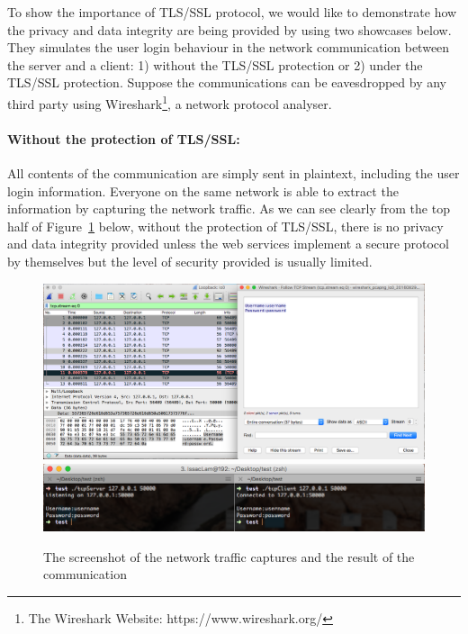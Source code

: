 To show the importance of TLS/SSL protocol, we would like to demonstrate how the privacy and data integrity are being provided by using two showcases below. They simulates the user login behaviour in the network communication between the server and a client: 1) without the TLS/SSL protection or 2) under the TLS/SSL protection. Suppose the communications can be eavesdropped by any third party using Wireshark\footnote{The Wireshark Website: https://www.wireshark.org/}, a network protocol analyser.

\paragraph{Without the protection of TLS/SSL:} All contents of the communication are simply sent in plaintext, including the user login information. Everyone on the same network is able to extract the information by capturing the network traffic. As we can see clearly from the top half of Figure~\ref{fig:withouttls} below, without the protection of TLS/SSL, there is no privacy and data integrity provided unless the web services implement a secure protocol by themselves but the level of security provided is usually limited.  
\begin{figure}[hpt]
 \centering
    \includegraphics[width=\textwidth]{./contents/images/tls/swithout.png}
    \includegraphics[width=\textwidth]{./contents/images/tls/twithout.png}
    \caption{The screenshot of the network traffic captures and the result of the communication}
    \label{fig:withouttls}
\end{figure}

